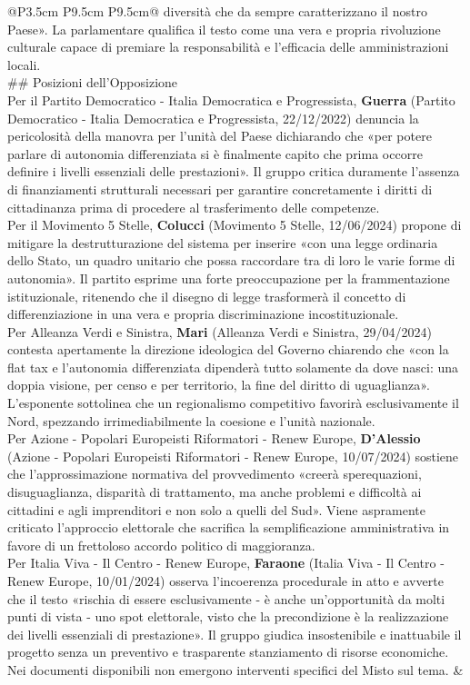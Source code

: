 \documentclass[a4paper,11pt]{article}
\begin{document}
\begin{landscape}
\begin{longtable}{@{}P{3.5cm} P{9.5cm} P{9.5cm}@{}}
diversità che da sempre caratterizzano il nostro Paese». La parlamentare qualifica il testo come una vera e propria rivoluzione culturale capace di premiare la responsabilità e l'efficacia delle amministrazioni locali.\\[6pt] \#\# Posizioni dell'Opposizione\\[6pt] Per il Partito Democratico - Italia Democratica e Progressista, \textbf{Guerra} (Partito Democratico - Italia Democratica e Progressista, 22/12/2022) denuncia la pericolosità della manovra per l'unità del Paese dichiarando che «per potere parlare di autonomia differenziata si è finalmente capito che prima occorre definire i livelli essenziali delle prestazioni». Il gruppo critica duramente l'assenza di finanziamenti strutturali necessari per garantire concretamente i diritti di cittadinanza prima di procedere al trasferimento delle competenze.\\[6pt] Per il Movimento 5 Stelle, \textbf{Colucci} (Movimento 5 Stelle, 12/06/2024) propone di mitigare la destrutturazione del sistema per inserire «con una legge ordinaria dello Stato, un quadro unitario che possa raccordare tra di loro le varie forme di autonomia». Il partito esprime una forte preoccupazione per la frammentazione istituzionale, ritenendo che il disegno di legge trasformerà il concetto di differenziazione in una vera e propria discriminazione incostituzionale.\\[6pt] Per Alleanza Verdi e Sinistra, \textbf{Mari} (Alleanza Verdi e Sinistra, 29/04/2024) contesta apertamente la direzione ideologica del Governo chiarendo che «con la flat tax e l'autonomia differenziata dipenderà tutto solamente da dove nasci: una doppia visione, per censo e per territorio, la fine del diritto di uguaglianza». L'esponente sottolinea che un regionalismo competitivo favorirà esclusivamente il Nord, spezzando irrimediabilmente la coesione e l'unità nazionale.\\[6pt] Per Azione - Popolari Europeisti Riformatori - Renew Europe, \textbf{D'Alessio} (Azione - Popolari Europeisti Riformatori - Renew Europe, 10/07/2024) sostiene che l'approssimazione normativa del provvedimento «creerà sperequazioni, disuguaglianza, disparità di trattamento, ma anche problemi e difficoltà ai cittadini e agli imprenditori e non solo a quelli del Sud». Viene aspramente criticato l'approccio elettorale che sacrifica la semplificazione amministrativa in favore di un frettoloso accordo politico di maggioranza.\\[6pt] Per Italia Viva - Il Centro - Renew Europe, \textbf{Faraone} (Italia Viva - Il Centro - Renew Europe, 10/01/2024) osserva l'incoerenza procedurale in atto e avverte che il testo «rischia di essere esclusivamente - è anche un'opportunità da molti punti di vista - uno spot elettorale, visto che la precondizione è la realizzazione dei livelli essenziali di prestazione». Il gruppo giudica insostenibile e inattuabile il progetto senza un preventivo e trasparente stanziamento di risorse economiche.\\[6pt] Nei documenti disponibili non emergono interventi specifici del Misto sul tema. & \\

\end{longtable}
\end{landscape}
\end{document}

